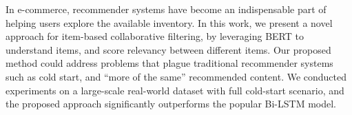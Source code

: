 In e-commerce, recommender systems have become an indispensable part of helping users explore the available inventory. In this work, we present a novel approach for item-based collaborative filtering, by leveraging BERT to understand items, and score relevancy between different items. Our proposed method could address problems that plague traditional recommender systems such as cold start, and ``more of the same'' recommended content. We conducted experiments on a large-scale real-world dataset with full cold-start scenario, and the proposed approach significantly outperforms the popular Bi-LSTM model.
